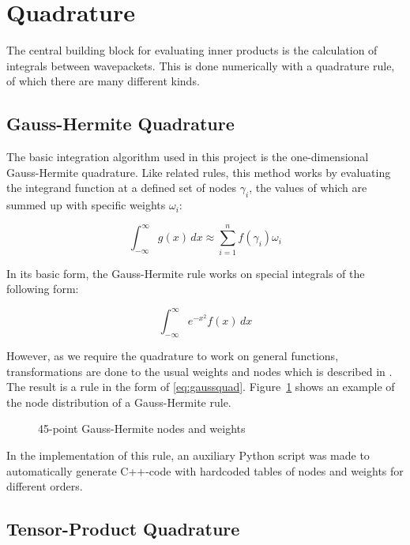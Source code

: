 \section{Quadrature}

The central building block for evaluating inner products is the calculation of
integrals between wavepackets.
This is done numerically with a quadrature rule, of which there are many
different kinds.


\subsection{Gauss-Hermite Quadrature}

The basic integration algorithm used in this project is the one-dimensional
Gauss-Hermite quadrature.
Like related rules, this method works by evaluating the integrand function at a
defined set of nodes $\gamma_i$, the values of which are summed up with specific
weights $\omega_i$:

\begin{equation}
  \label{eq:gaussquad}
  \int_{-\infty}^{\infty} g(x) \, dx \approx \sum_{i=1}^{n} f(\gamma_i) \omega_i
\end{equation}

In its basic form, the Gauss-Hermite rule works on special integrals of the
following form:

\begin{equation}
  \int_{-\infty}^{\infty} e^{-x^2} f(x) \, dx
\end{equation}

However, as we require the quadrature to work on general functions,
transformations are done to the usual weights and nodes which is described in
\cite{B_master_thesis}.
The result is a rule in the form of \eqref{eq:gaussquad}.
Figure~\ref{fig:ghexample} shows an example of the node distribution of a
Gauss-Hermite rule.

\begin{figure}
  \center
  
  \caption{45-point Gauss-Hermite nodes and weights}
  \label{fig:ghexample}
\end{figure}

In the implementation of this rule, an auxiliary Python script was made to
automatically generate C++-code with hardcoded tables of nodes and weights for
different orders.


\subsection{Tensor-Product Quadrature}

